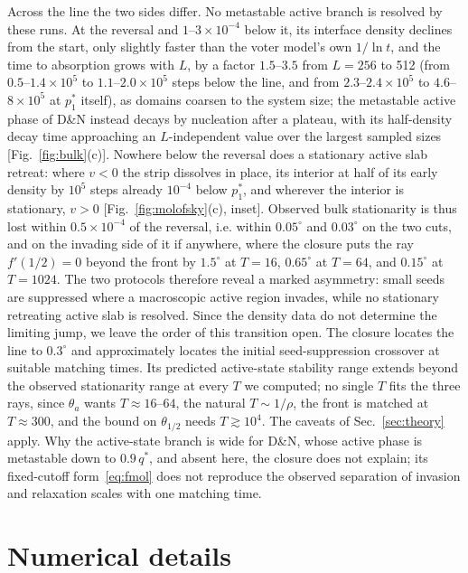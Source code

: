 \documentclass[pre,twocolumn,superscriptaddress,showpacs,floatfix]{revtex4-2}
\newcommand{\qs}{q^{*}}
\begin{document}
Across the line the two sides differ. No metastable active branch is resolved by these runs. At the
reversal and $1$--$3\times10^{-4}$ below it, its interface density declines from the start, only
slightly faster than the voter model's own $1/\ln t$, and the time to absorption grows with $L$,
by a factor $1.5$--$3.5$ from $L = 256$ to 512 (from $0.5$--$1.4\times10^5$ to
$1.1$--$2.0\times10^5$ steps below the line, and from $2.3$--$2.4\times10^5$ to
$4.6$--$8\times10^5$ at $p_1^*$ itself), as domains coarsen to the system size; the metastable
active phase of D\&N instead decays by nucleation after a plateau, with its
half-density decay time approaching an $L$-independent value over the largest
sampled sizes [Fig.~\ref{fig:bulk}(c)]. Nowhere below the reversal does a stationary active slab
retreat: where $v < 0$ the strip dissolves in place, its interior at half of its early density
by $10^5$ steps already $10^{-4}$ below $p_1^*$, and wherever the interior is stationary,
$v > 0$ [Fig.~\ref{fig:molofsky}(c), inset]. Observed bulk stationarity is thus lost within
$0.5\times10^{-4}$ of the reversal, i.e. within $0.05^\circ$ and $0.03^\circ$ on the two cuts,
and on the invading side of it if anywhere, where the closure puts the ray $f'(1/2) = 0$ beyond
the front by $1.5^\circ$ at $T = 16$, $0.65^\circ$ at $T = 64$, and $0.15^\circ$ at $T = 1024$.
The two protocols therefore reveal a marked asymmetry: small seeds are suppressed where a macroscopic active region invades, while no stationary retreating active slab is resolved. Since the density data do not determine the limiting jump, we leave the order of this transition open. The closure locates the line to $0.3^\circ$
and approximately locates the initial seed-suppression crossover at suitable
matching times. Its predicted active-state stability range extends beyond
the observed stationarity range at every $T$ we computed; no
single $T$ fits the three rays, since $\theta_a$ wants $T\approx 16$--$64$, the natural
$T\sim 1/\rho$, the front is matched at $T\approx 300$, and the bound on $\theta_{1/2}$ needs
$T\gtrsim 10^4$. The caveats of Sec.~\ref{sec:theory} apply. Why the active-state branch is wide for D\&N, whose active phase is
metastable down to $0.9\,\qs$, and absent here, the closure does not explain; its
fixed-cutoff form~\eqref{eq:fmol} does not reproduce the observed separation of
invasion and relaxation scales with one matching time.
\section{Numerical details}
\label{app:numerics}
\end{document}
